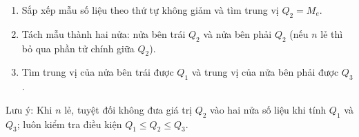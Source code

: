 \begin{enumerate}
\item Sắp xếp mẫu số liệu theo thứ tự không giảm và tìm trung vị $Q_2 = M_e$.
\item Tách mẫu thành hai nửa: nửa bên trái $Q_2$ và nửa bên phải $Q_2$ (nếu $n$ lẻ thì bỏ qua phần tử chính giữa $Q_2$).
\item Tìm trung vị của nửa bên trái được $Q_1$ và trung vị của nửa bên phải được $Q_3$.
\end{enumerate}
Lưu ý: Khi $n$ lẻ, tuyệt đối không đưa giá trị $Q_2$ vào hai nửa số liệu khi tính $Q_1$ và $Q_3$; luôn kiểm tra điều kiện $Q_1 \le Q_2 \le Q_3$.
